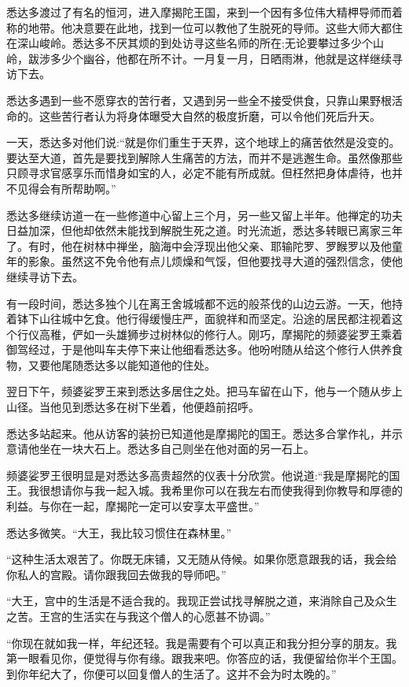 \documentclass[12pt,twoside,openany]{book}
\begin{document}
悉达多渡过了有名的恒河，进入摩揭陀王国，来到一个因有多位伟大精柙导师而着称的地带。他决意要在此地，找到一位可以教他了生脱死的导师。这些大师大都住在深山峻岭。悉达多不厌其烦的到处访寻这些名师的所在;无论要攀过多少个山岭，跋涉多少个幽谷，他都在所不计。一月复一月，日晒雨淋，他就是这样继续寻访下去。

悉达多遇到一些不愿穿衣的苦行者，又遇到另一些全不接受供食，只靠山果野根活命的。这些苦行者认为将身体曝受大自然的极度折磨，可以令他们死后升天。

一天，悉达多对他们说:“就是你们重生于天界，这个地球上的痛苦依然是没变的。要达至大道，首先是要找到解除人生痛苦的方法，而并不是逃邂生命。虽然像那些只顾寻求官感享乐而惜身如宝的人，必定不能有所成就。但枉然把身体虐待，也并不见得会有所帮助啊。”

悉达多继续访道一在一些修道中心留上三个月，另一些又留上半年。他禅定的功夫日益加深，但他却依然未能找到解脱生死之道。时光流逝，悉达多转眼已离家三年了。有时，他在树林中禅坐，脑海中会浮现出他父亲、耶输陀罗、罗睺罗以及他童年的影象。虽然这不免令他有点儿烦燥和气馁，但他要找寻大道的强烈信念，使他继续寻访下去。

有一段时间，悉达多独个儿在离王舍城城都不远的般茶伐的山边云游。一天，他持着钵下山往城中乞食。他行得缓慢庄严，面貌祥和而坚定。沿途的居民都注视着这个行仪高稚，俨如一头雄狮步过树林似的修行人。刚巧，摩揭陀的频婆娑罗王乘着御驾经过，于是他叫车夫停下来让他细看悉达多。他吩咐随从给这个修行人供养食物，又要他尾随悉达多以能知道他的住处。

翌日下午，频婆娑罗王来到悉达多居住之处。把马车留在山下，他与一个随从步上山径。当他见到悉达多在树下坐着，他便趋前招呼。

悉达多站起来。他从访客的装扮已知道他是摩揭陀的国王。悉达多合掌作礼，并示意请他坐在一块大石上。悉达多自己则坐在他对面的另一石上。

频婆娑罗王很明显是对悉达多高贵超然的仪表十分欣赏。他说道:“我是摩揭陀的国王。我很想请你与我一起入城。我希里你可以在我左右而使我得到你教导和厚德的利益。与你在一起，摩揭陀一定可以安享太平盛世。”

悉达多微笑。“大王，我比较习惯住在森林里。”

“这种生活太艰苦了。你既无床铺，又无随从侍候。如果你愿意跟我的话，我会给你私人的宫殿。请你跟我回去做我的导师吧。”

“大王，宫中的生活是不适合我的。我现正尝试找寻解脱之道，来消除自己及众生之苦。王宫的生活实在与我这个僧人的心愿甚不协调。”

“你现在就如我一样，年纪还轻。我是需要有个可以真正和我分担分享的朋友。我第一眼看见你，便觉得与你有缘。跟我来吧。你答应的话，我便留给你半个王国。到你年纪大了，你便可以回复僧人的生活了。这并不会为时太晚的。”
\end{document}
